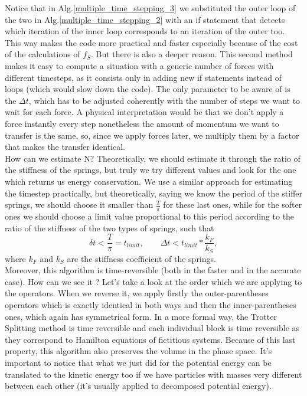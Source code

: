 Notice that in Alg.\ref{multiple_time_stepping_3} we substituted the outer loop of the two in Alg.\ref{multiple_time_stepping_2} with an if statement that detects which iteration of the inner loop corresponds to an iteration of the outer too. This way makes the code more practical and faster especially because of the cost of the calculations of $f_S$. But there is also a deeper reason. This second method makes it easy to compute a situation with a generic number of forces with different timesteps, as it consists only in adding new if statements instead of loops (which would slow down the code). The only parameter to be aware of is the $\Delta t$, which has to be adjusted coherently with the number of steps we want to wait for each force. A physical interpretation would be that we don't apply a force instantly every step nonetheless the amount of momentum we want to transfer is the same, so, since we apply forces later, we multiply them by a factor that makes the transfer identical.\\
How can we estimate N? Theoretically, we should estimate it through the ratio of the stiffness of the springs, but truly we try different values and look for the one which returns us energy conservation. We use a similar approach for estimating the timestep practically, but theoretically, saying we know the period of the stiffer springs, we should choose it smaller than $\frac{T}{\pi}$ for these last ones, while for the softer ones we should choose a limit value proportional to this period according to the ratio of the stiffness of the two types of springs, such that
\begin{equation*}
    \delta t < \frac{T}{\pi}=t_{limit}, \qquad \Delta t < t_{limit}*\frac{k_F}{k_S},
\end{equation*}
where $k_F$ and $k_S$ are the stiffness coefficient of the springs.\\
Moreover, this algorithm is time-reversible (both in the faster and in the accurate case). How can we see it ? Let's take a look at the order which we are applying to the operators. When we reverse it, we apply firstly the outer-parentheses operators which is exactly identical in both ways and then the inner-parentheses ones, which again has symmetrical form. In a more formal way, the Trotter Splitting method is time reversible and each individual block is time reversible as they correspond to Hamilton equations of fictitious systems. Because of this last property, this algorithm also preserves the volume in the phase space. It's important to notice that what we just did for the potential energy can be translated to the kinetic energy too if we have particles with masses very different between each other (it's usually applied to decomposed potential energy).
